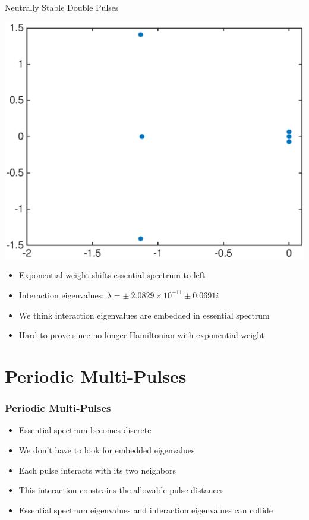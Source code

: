 \documentclass[16pt]{beamer}
\begin{document}
\begin{frame}{Neutrally Stable Double Pulses}
	\begin{center}
		\includegraphics[width=0.5\linewidth]{images/stableeigweighted2}
	\end{center}
	\begin{itemize}
		\item Exponential weight shifts essential spectrum to left
		\item Interaction eigenvalues: $\lambda = \pm \: 2.0829 \times 10^{-11} \pm 0.0691i$
		\item We think interaction eigenvalues are embedded in essential spectrum
		\item Hard to prove since no longer Hamiltonian with exponential weight
	\end{itemize}
\end{frame}

\section{Periodic Multi-Pulses}

\begin{frame}
	\frametitle{Periodic Multi-Pulses}
	\fontsize{16}{7.2}\selectfont
	\begin{itemize}
		\item Essential spectrum becomes discrete
		\vspace{0.5cm}
		\item We don't have to look for embedded eigenvalues
		\vspace{0.5cm}
		\item Each pulse interacts with its two neighbors
		\vspace{0.5cm}
		\item This interaction constrains the allowable pulse distances
		\vspace{0.5cm}
		\item Essential spectrum eigenvalues and interaction eigenvalues can collide
	\end{itemize}
\end{frame}
\end{document}
